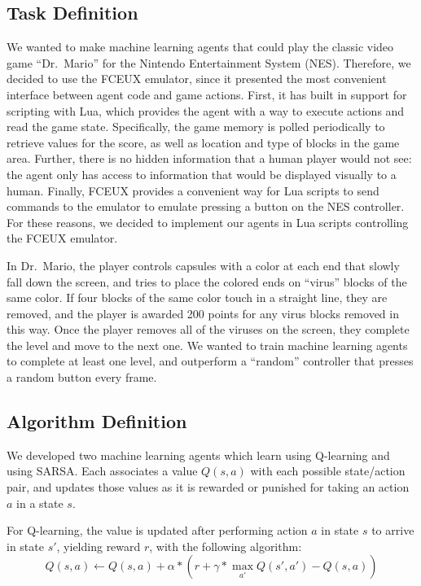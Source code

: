 \documentclass[letterpaper]{article} %
\begin{document}
\subsection{Task Definition}
We wanted to make machine learning agents that could play the classic video game ``Dr.~Mario'' for the Nintendo Entertainment System (NES). Therefore, we decided to use the FCEUX emulator, since it presented the most convenient interface between agent code and game actions. First, it has built in support for scripting with Lua​, which provides the agent with a way to execute actions and read the game state. Specifically, the game memory is polled periodically to retrieve values for the score, as well as location and type of blocks​ in the game area. Further, there is no hidden information that a human player would not see​: the agent only has access to information that would be displayed visually to a human. Finally, FCEUX provides a convenient way for Lua scripts to send commands to the emulator to emulate pressing a button on the NES controller. For these reasons, we decided to implement our agents in Lua scripts controlling the FCEUX emulator.

In Dr.~Mario, the player controls capsules with a color at each end that slowly fall down the screen, and tries to place the colored ends on ``virus'' blocks of the same color. If four blocks of the same color touch in a straight line, they are removed, and the player is awarded 200 points for any virus blocks removed in this way. Once the player removes all of the viruses on the screen, they complete the level and move to the next one. We wanted to train machine learning agents to complete at least one level, and outperform a ``random'' controller that presses a random button every frame.

\subsection{Algorithm Definition}
We developed two machine learning agents which learn using Q-learning and using SARSA. Each associates a value \(Q(s, a)\) with each possible state/action pair, and updates those values as it is rewarded or punished for taking an action \(a\) in a state \(s\).

For Q-learning, the value is updated after performing action \(a\) in state \(s\) to arrive in state \(s'\), yielding reward \(r\), with the following algorithm:
\begin{equation}
Q(s, a) \leftarrow Q(s, a) + \alpha * (r + \gamma * {\max}_{a'} Q(s', a') - Q(s, a))
\end{equation}
\end{document}
